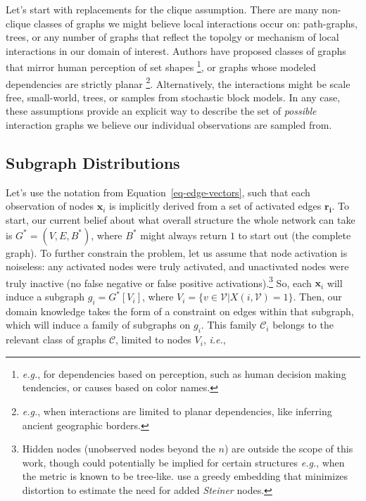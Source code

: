 \documentclass[%
	12pt,
		oneside,
		letterpaper
]{book}
\begin{document}
Let's start with replacements for the clique assumption. There are many
non-clique classes of graphs we might believe local interactions occur
on: path-graphs, trees, or any number of graphs that reflect the topolgy
or mechanism of local interactions in our domain of interest. Authors
have proposed classes of graphs that mirror human perception of set
shapes \autocite{Relativeneighborhoodgraphs_Jaromczyk1992}\footnote{
  \emph{e.g.}, for dependencies based on perception, such as human
  decision making tendencies, or causes based on color names.}, or
graphs whose modeled dependencies are strictly planar
\autocite{toolfilteringinformation_Tumminello2005}\footnote{
  \emph{e.g.}, when interactions are limited to planar dependencies,
  like inferring ancient geographic borders.}. Alternatively, the
interactions might be scale free, small-world, trees, or samples from
stochastic block
models.\autocite{StochasticblockmodelsFirst_Holland1983} In any case,
these assumptions provide an explicit way to describe the set of
\emph{possible} interaction graphs we believe our individual
observations are sampled from.

\subsection{Subgraph Distributions}\label{sec-subgraph-dists}

Let's use the notation from Equation~\ref{eq-edge-vectors}, such that
each observation of nodes \(\mathbf{x}_i\) is implicitly derived from a
set of activated edges \(\mathbf{r_i}\). To start, our current belief
about what overall structure the whole network can take is
\(G^*=(V,E,B^*)\), where \(B^*\) might always return \(1\) to start out
(the complete graph). To further constrain the problem, let us assume
that node activation is noiseless: any activated nodes were truly
activated, and unactivated nodes were truly inactive (no false negative
or false positive activations).\footnote{ Hidden nodes (unobserved nodes
  beyond the \(n\)) are outside the scope of this work, though could
  potentially be implied for certain structures \emph{e.g.}, when the
  metric is known to be tree-like. \textcite{TreeIam_Sonthalia2020} use
  a greedy embedding that minimizes distortion to estimate the need for
  added \emph{Steiner} nodes.} So, each \(\mathbf{x}_i\) will induce a
subgraph \(g_i = G^*[V_i]\), where
\(V_i = \{v\in \mathcal{V} | X(i,\mathcal{V})=1\}\). Then, our domain
knowledge takes the form of a constraint on edges within that subgraph,
which will induce a family of subgraphs on \(g_i\). This family
\(\mathcal{C}_i\) belongs to the relevant class of graphs
\(\mathcal{C}\), limited to nodes \(V_i\), \emph{i.e.},
\end{document}
